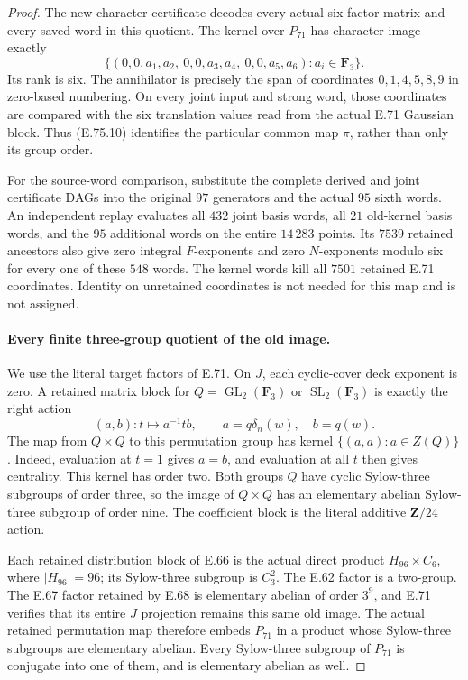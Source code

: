 \begin{proof}
The new character certificate decodes every actual
six-factor matrix and every saved word in this quotient.
The kernel over $P_{71}$ has character image exactly
\[
 \{(0,0,a_1,a_2,\ 0,0,a_3,a_4,\ 0,0,a_5,a_6)
                      :a_i\in\mathbf F_3\}.
 \tag{E.75.12}
\]
Its rank is six. The annihilator is precisely the span
of coordinates $0,1,4,5,8,9$ in zero-based numbering.
On every joint input and strong word, those coordinates
are compared with the six translation values read from
the actual E.71 Gaussian block. Thus (E.75.10) identifies
the particular common map $\pi$, rather than only its
group order.

For the source-word comparison, substitute the complete
derived and joint certificate DAGs into the original
$97$ generators and the actual $95$ sixth words. An
independent replay evaluates all $432$ joint basis
words, all $21$ old-kernel basis words, and the $95$
additional words on the entire $14\,283$ points. Its
$7539$ retained ancestors also give zero integral
$F$-exponents and zero $N$-exponents modulo six for
every one of these $548$ words. The kernel words kill
all $7501$ retained E.71 coordinates. Identity on
unretained coordinates is not needed for this map and
is not assigned.

\paragraph{Every finite three-group quotient of the old image.}
We use the literal target factors of E.71. On $J$, each
cyclic-cover deck exponent is zero. A retained matrix
block for $Q=\operatorname{GL}_2(\mathbf F_3)$ or
$\operatorname{SL}_2(\mathbf F_3)$ is exactly the right
action
\[
       (a,b):t\longmapsto a^{-1}tb,
       \qquad a=q\delta_n(w),\quad b=q(w).
 \tag{E.75.13}
\]
The map from $Q\times Q$ to this permutation group
has kernel $\{(a,a):a\in Z(Q)\}$. Indeed, evaluation
at $t=1$ gives $a=b$, and evaluation at all $t$
then gives centrality. This kernel has order two.
Both groups $Q$ have cyclic Sylow-three subgroups of
order three, so the image of $Q\times Q$ has an
elementary abelian Sylow-three subgroup of order nine.
The coefficient block is the literal additive
$\mathbf Z/24$ action.

Each retained distribution block of E.66 is the actual direct product
$H_{96}\times C_6$, where $|H_{96}|=96$; its
Sylow-three subgroup is $C_3^2$. The E.62 factor is
a two-group. The E.67 factor retained by E.68 is
elementary abelian of order $3^9$, and E.71 verifies
that its entire $J$ projection remains this same
old image. The actual retained permutation map
therefore embeds $P_{71}$ in a product whose
Sylow-three subgroups are elementary abelian.
Every Sylow-three subgroup of $P_{71}$ is conjugate
into one of them, and is elementary abelian as well.


\end{proof}
